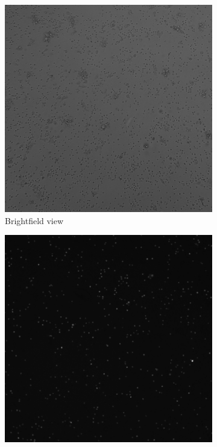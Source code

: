 \begin{figure}[h]
    \centering
    \begin{subfigure}[h!]{0.3\textwidth}
        \includegraphics[width=\textwidth]{dissertation/figures/example_Brightfield.png}
        \caption{Brightfield view}
        \label{fig:fov_brightfield}
    \end{subfigure}
    \begin{subfigure}[h!]{0.3\textwidth}
        \includegraphics[width=\textwidth]{dissertation/figures/example_FITC.png}

\end{subfigure}
\end{figure}
